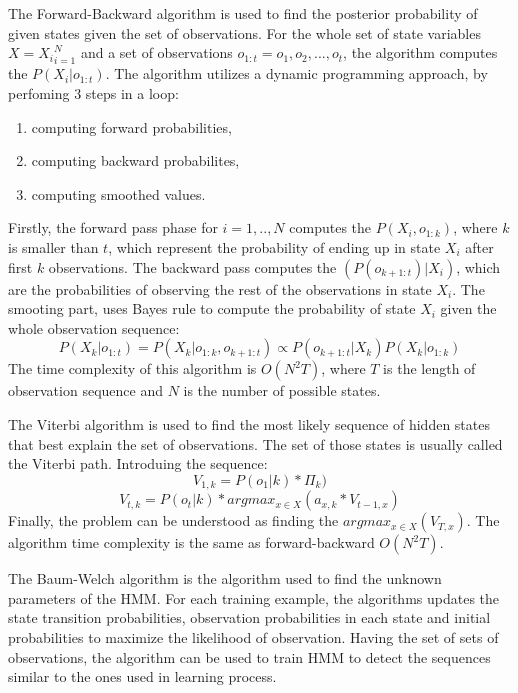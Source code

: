 The Forward-Backward algorithm is used to find the posterior probability of given states given the set of observations.
For the whole set of state variables $X = {X_i}_{i=1}^{N}$ and a set of observations $o_{1:t} = o_1, o_2,...,o_t$, the algorithm computes the $P(X_i | o_{1:t})$.
The algorithm utilizes a dynamic programming approach, by perfoming 3 steps in a loop: 
\begin{enumerate}
\item computing forward probabilities,
\item computing backward probabilites,
\item computing smoothed values.
\end{enumerate}
Firstly, the forward pass phase for $i=1,..,N$ computes the $P(X_i, o_{1:k})$, where $k$ is smaller than $t$, which represent the probability of ending up in state $X_i$ after first $k$ observations. 
The backward pass computes the $(P(o_{k+1:t}) | X_i)$, which are the probabilities of observing the rest of the observations in state $X_i$.
The smooting part, uses Bayes rule to compute the probability of state $X_i$ given the whole observation sequence:
\begin{equation}
P(X_k | o_{1:t}) = P(X_k | o_{1:k}, o_{k+1:t}) \propto P(o_{k+1:t} | X_k) P(X_k | o_{1:k})
\end{equation}
The time complexity of this algorithm is $O(N^2 T)$, where $T$ is the length of observation sequence and $N$ is the number of possible states.

The Viterbi algorithm is used to find the most likely sequence of hidden states that best explain the set of observations.
The set of those states is usually called the Viterbi path. 
Introduing the sequence:
\begin{equation}
V_{1,k} = P(o_1 | k) * \Pi_k)
\end{equation}
\begin{equation}
V_{t,k} = P(o_t | k) * argmax_{x\in X}(a_{x,k} * V_{t-1,x})
\end{equation}
Finally, the problem can be understood as finding the $argmax_{x\in X}(V_{T,x})$. 
The algorithm time complexity is the same as forward-backward $O(N^2 T)$.

The Baum-Welch algorithm is the algorithm used to find the unknown parameters of the HMM.
For each training example, the algorithms updates the state transition probabilities, observation probabilities in each state and initial probabilities to maximize the likelihood of observation.
Having the set of sets of observations, the algorithm can be used to train HMM to detect the sequences similar to the ones used in learning process.

